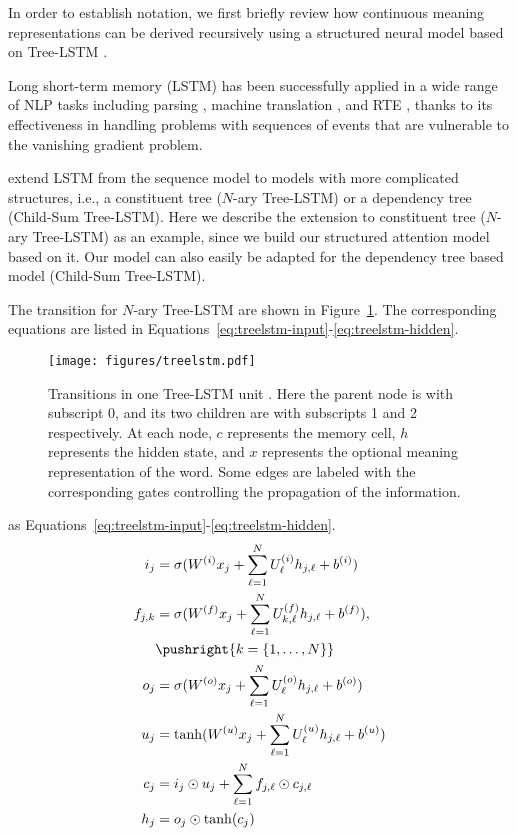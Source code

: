 
In order to establish notation, we first briefly review 
how continuous meaning representations
can be derived recursively using a structured neural model
based on Tree-LSTM \cite{tai2015improved}.

Long short-term memory (LSTM) \cite{hochreiter1997long} 
has been successfully applied in a wide 
range of NLP tasks including 
parsing \cite{dyer2015transition},
machine translation \cite{sutskever2014sequence},
and RTE \cite{bowman2015large},
thanks to its effectiveness in handling problems 
with sequences of events that are vulnerable to 
the vanishing gradient problem.

 extend LSTM from the sequence model 
to models with more
complicated structures, i.e., a constituent tree ($N$-ary Tree-LSTM) or
a dependency tree (Child-Sum Tree-LSTM).
Here we describe the extension to constituent tree ($N$-ary Tree-LSTM) 
as an example,
since we build our structured attention model based on it.
Our model can also easily be adapted for the 
dependency tree based model (Child-Sum Tree-LSTM). 

The transition for $N$-ary Tree-LSTM are shown 
in Figure~\ref{fig:treelstm}.
The corresponding equations are listed in 
Equations~\ref{eq:treelstm-input}-\ref{eq:treelstm-hidden}.

\begin{figure}
\centering
\texttt{[image: figures/treelstm.pdf]}
\caption{Transitions in one Tree-LSTM unit \protect\cite{tai2015improved}.
Here the parent node is with subscript 0, and its two children are with 
subscripts 1 and 2 respectively. 
At each node, $c$ represents the memory cell, 
$h$ represents the hidden state,
and $x$ represents the optional meaning representation of the word.
Some edges are labeled with the corresponding gates 
controlling the propagation of the information.
\label{fig:treelstm}}
\end{figure}

as Equations~\ref{eq:treelstm-input}-\ref{eq:treelstm-hidden}.
\begin{align}
i_j & = \sigma(W^{(i)}x_j + \sum_{\ell=1}^N U_\ell^{(i)}h_{j, \ell}+b^{(i)}) \label{eq:treelstm-input}\\
f_{j,k} & = \sigma(W^{(f)}x_j + \sum_{\ell=1}^N U_{k, \ell}^{(f)}h_{j, \ell} +b^{(f)}), \notag\\
& \pushright{k = \{1,\dots, N\}} \label{eq:treelstm-forget}\\
o_j & = \sigma(W^{(o)}x_j + \sum_{\ell=1}^N U_\ell^{(o)}h_{j,\ell} + b^{(o)})\label{eq:treelstm-output}\\
u_j & = \tanh(W^{(u)}x_j + \sum_{\ell=1}^N U_\ell^{(u)}h_{j,\ell} + b^{(u)})\\
c_j & = i_j \odot u_j + \sum_{\ell=1}^N f_{j, \ell} \odot c_{j, \ell}\label{eq:treelstm-mem}\\
h_j & = o_j \odot \tanh(c_j) \label{eq:treelstm-hidden}
\end{align}